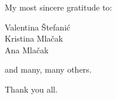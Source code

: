 \documentclass[a5paper,12pt]{book} %
\begin{document}
\thispagestyle{empty}
\vspace*{0.1\textheight}
\clearpage %

\thispagestyle{empty}
\vspace*{0.2\textheight}
\begin{flushright}
My most sincere gratitude to:

Valentina Štefanić \\
Kristina Mlačak \\
Ana Mlačak

and many, many others.

Thank you all.
\end{flushright}
\clearpage %

\thispagestyle{empty}
\vspace*{0.1\textheight}
\clearpage %












\end{document}
